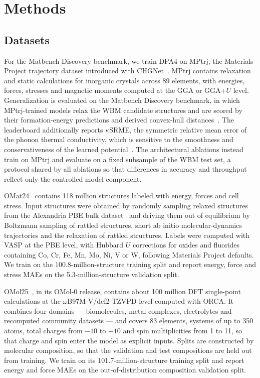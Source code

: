 \section{Methods}
\label{sec:methods}

\subsection{Datasets}

For the Matbench Discovery benchmark, we train DPA4 on MPtrj, the Materials Project trajectory dataset introduced with CHGNet~\cite{deng2023chgnet,jain2013materials}.
MPtrj contains relaxation and static calculations for inorganic crystals across 89 elements, with energies, forces, stresses and magnetic moments computed at the GGA or GGA+$U$ level.
Generalization is evaluated on the Matbench Discovery benchmark, in which MPtrj-trained models relax the WBM candidate structures and are scored by their formation-energy predictions and derived convex-hull distances~\cite{riebesell2025matbench,WBM}.
The leaderboard additionally reports $\kappa$SRME, the symmetric relative mean error of the phonon thermal conductivity, which is sensitive to the smoothness and conservativeness of the learned potential~\cite{pota2024thermal}.
The architectural ablations instead train on MPtrj and evaluate on a fixed subsample of the WBM test set, a protocol shared by all ablations so that differences in accuracy and throughput reflect only the controlled model component.

OMat24~\cite{barroso2024open} contains 118 million structures labeled with energy, forces and cell stress.
Input structures were obtained by randomly sampling relaxed structures from the Alexandria PBE bulk dataset~\cite{schmidt2023alexandria} and driving them out of equilibrium by Boltzmann sampling of rattled structures, short ab initio molecular-dynamics trajectories and the relaxation of rattled structures.
Labels were computed with VASP at the PBE level, with Hubbard $U$ corrections for oxides and fluorides containing Co, Cr, Fe, Mn, Mo, Ni, V or W, following Materials Project defaults.
We train on the 100.8-million-structure training split and report energy, force and stress MAEs on the 5.3-million-structure validation split.

OMol25~\cite{levine2025open}, in its OMol-0 release, contains about 100 million DFT single-point calculations at the $\omega$B97M-V/def2-TZVPD level computed with ORCA.
It combines four domains --- biomolecules, metal complexes, electrolytes and recomputed community datasets --- and covers 83 elements, systems of up to 350 atoms, total charges from $-10$ to $+10$ and spin multiplicities from 1 to 11, so that charge and spin enter the model as explicit inputs.
Splits are constructed by molecular composition, so that the validation and test compositions are held out from training.
We train on its 101.7-million-structure training split and report energy and force MAEs on the out-of-distribution composition validation split.

